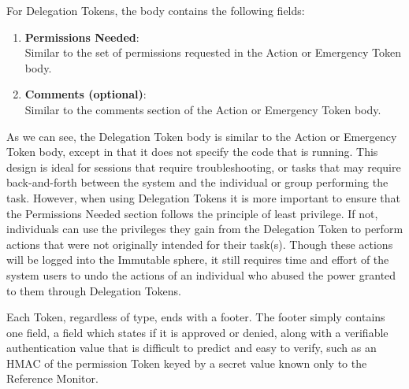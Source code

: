 For Delegation Tokens, the body contains the following fields:
\begin{enumerate}
\item \textbf{Permissions Needed}:\\
Similar to the set of permissions requested in the Action or Emergency Token
body.
\item \textbf{Comments (optional)}:\\
Similar to the comments section of the Action or Emergency Token body.
\end{enumerate}

As we can see, the Delegation Token body is similar to the Action or Emergency
Token body, except in that it does not specify the code that is running. This
design is ideal for sessions that require troubleshooting, or tasks that may
require back-and-forth between the system and the individual or group performing
the task. However, when using Delegation Tokens it is
more important to ensure that the Permissions Needed section follows the
principle of least privilege. If not, individuals can use the privileges they
gain from the Delegation Token to perform actions that were not originally
intended for their task(s). Though these actions will be logged into the
Immutable sphere, it still requires time and effort of the system users to undo
the actions of an individual who abused the power granted to them through
Delegation Tokens.

Each Token, regardless of type, ends with a footer. The footer simply contains
one field, a field which states if it is approved or denied, along with a
verifiable authentication value that is difficult to predict and easy to verify,
such as an HMAC of the permission Token keyed by a secret value known only to
the Reference Monitor.

